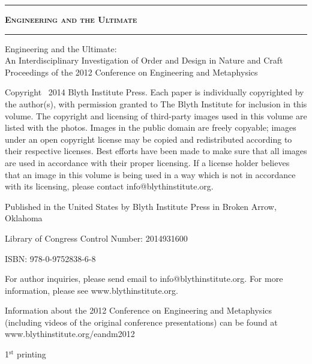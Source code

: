 \begin{titlepage}
\begingroup

\setlength{\parindent}{0cm}
\setlength{\parskip}{1em}

\vspace*{\fill}
\begin{center}
\hrule
{\LARGE \textsc{\textbf{Engineering and the Ultimate}}}
\baselineskip
\hrule
\end{center}
\vspace*{\fill}

\clearpage %

\thispagestyle{empty}
\vspace*{\fill}

{\small
Engineering and the Ultimate: \\ An Interdisciplinary Investigation of Order and Design in Nature and Craft \\ Proceedings of the 2012 Conference on Engineering and Metaphysics

Copyright \textcopyright\ 2014 Blyth Institute Press.  Each paper is individually copyrighted by the author(s), with permission granted to The Blyth Institute for inclusion in this volume.  The copyright and licensing of third-party images used in this volume are listed with the photos.  Images in the public domain are freely copyable; images under an open copyright license may be copied and redistributed according to their respective licenses.  Best efforts have been made to make sure that all images are used in accordance with their proper licensing.  If a license holder believes that an image in this volume is being used in a way which is not in accordance with its licensing, please contact info@blythinstitute.org.

Published in the United States by Blyth Institute Press in Broken Arrow, Oklahoma

Library of Congress Control Number: 2014931600 

ISBN: 978-0-9752838-6-8

For author inquiries, please send email to info@blythinstitute.org.  For more information, please see www.blythinstitute.org.

Information about the 2012 Conference on Engineering and Metaphysics (including videos of the original conference presentations) can be found at www.blythinstitute.org/eandm2012

\baselineskip

1$^{\textrm{st}}$ printing}


\end{titlepage}
